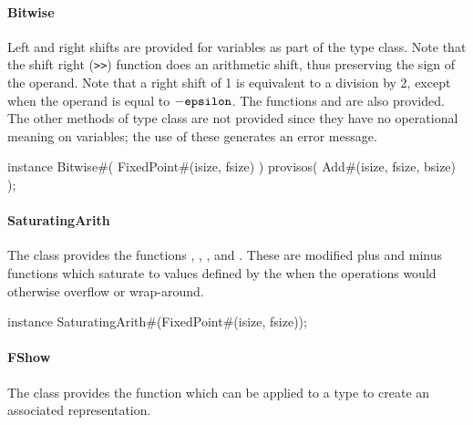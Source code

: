 \paragraph{Bitwise}

Left and right shifts are provided for  variables
as part of the  type class.  Note that the shift right
({\verb^>>^}) function does an arithmetic shift, thus preserving the sign
of the operand. Note that a right shift of 1 is equivalent to a
division by 2, except when the operand is equal to $- {\tt
epsilon}$.  The functions  and  are also provided.   The other 
methods of  type class are not provided since they
have no operational meaning on  variables; the use of
these generates an error message.

\begin{libverbatim}
instance Bitwise#( FixedPoint#(isize, fsize) )
   provisos( Add#(isize, fsize, bsize) );
\end{libverbatim}

\paragraph{SaturatingArith}

The  class provides the functions , 
, , and .  These  are
modified plus and minus functions which 
saturate to values defined by the  when the
operations would otherwise overflow or wrap-around.

\begin{libverbatim}
instance SaturatingArith#(FixedPoint#(isize, fsize));
\end{libverbatim}

\paragraph{FShow}
The  class provides the function  which can be
applied to a  type to create an associated  representation.


